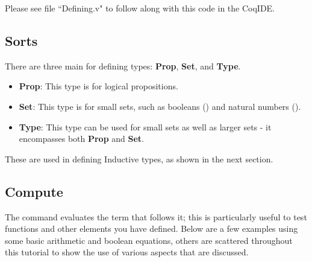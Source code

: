 
Please see file ``Defining.v" to follow along with this code in the CoqIDE. 

\subsection{Sorts} \label{subsec: sort}
There are three main  for defining types: {\bf Prop}, {\bf Set}, and {\bf Type}. 
\begin{itemize}
	\item {\bf Prop}: This type is for logical propositions. 
	\item {\bf Set}: This type is for small sets, such as booleans () and natural numbers (). 
	\item {\bf Type}: This type can be used for small sets as well as larger sets - it encompasses both {\bf Prop} and {\bf Set}. 
\end{itemize}

\noindent
These are used in defining Inductive types, as shown in the next section.






\subsection{Compute} \label{subsec: compute}

The command  evaluates the term that follows it; 
this is particularly useful to test functions and other elements you have defined. 
Below are a few examples using some basic arithmetic and boolean equations, 
others are scattered throughout this tutorial to show the use of various aspects that are discussed. 

